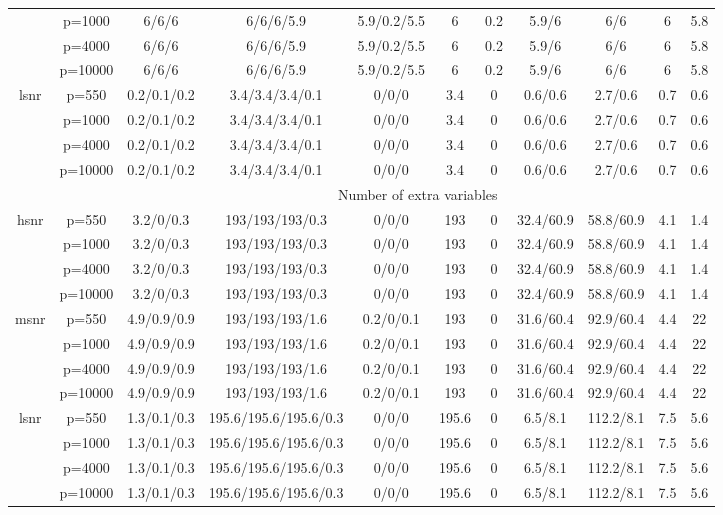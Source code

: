 \begin{table}[ht]
{\begin{tabular}{|c|c|ccccccccc|}
   & p=1000 & 6/6/6 & 6/6/6/5.9 & 5.9/0.2/5.5 & 6 & 0.2 & 5.9/6 & 6/6 & 6 & 5.8 \\ 
   & p=4000 & 6/6/6 & 6/6/6/5.9 & 5.9/0.2/5.5 & 6 & 0.2 & 5.9/6 & 6/6 & 6 & 5.8 \\ 
   & p=10000 & 6/6/6 & 6/6/6/5.9 & 5.9/0.2/5.5 & 6 & 0.2 & 5.9/6 & 6/6 & 6 & 5.8 \\ 
  \midrule\multirow{4}[2]{*}{lsnr} & p=550 & 0.2/0.1/0.2 & 3.4/3.4/3.4/0.1 & 0/0/0 & 3.4 & 0 & 0.6/0.6 & 2.7/0.6 & 0.7 & 0.6 \\ 
   & p=1000 & 0.2/0.1/0.2 & 3.4/3.4/3.4/0.1 & 0/0/0 & 3.4 & 0 & 0.6/0.6 & 2.7/0.6 & 0.7 & 0.6 \\ 
   & p=4000 & 0.2/0.1/0.2 & 3.4/3.4/3.4/0.1 & 0/0/0 & 3.4 & 0 & 0.6/0.6 & 2.7/0.6 & 0.7 & 0.6 \\ 
   & p=10000 & 0.2/0.1/0.2 & 3.4/3.4/3.4/0.1 & 0/0/0 & 3.4 & 0 & 0.6/0.6 & 2.7/0.6 & 0.7 & 0.6 \\ 
   \midrule 
 \multicolumn{1}{|c}{} &       & \multicolumn{9}{c|}{Number of extra variables} \\
\midrule\multirow{4}[2]{*}{hsnr} & p=550 & 3.2/0/0.3 & 193/193/193/0.3 & 0/0/0 & 193 & 0 & 32.4/60.9 & 58.8/60.9 & 4.1 & 1.4 \\ 
   & p=1000 & 3.2/0/0.3 & 193/193/193/0.3 & 0/0/0 & 193 & 0 & 32.4/60.9 & 58.8/60.9 & 4.1 & 1.4 \\ 
   & p=4000 & 3.2/0/0.3 & 193/193/193/0.3 & 0/0/0 & 193 & 0 & 32.4/60.9 & 58.8/60.9 & 4.1 & 1.4 \\ 
   & p=10000 & 3.2/0/0.3 & 193/193/193/0.3 & 0/0/0 & 193 & 0 & 32.4/60.9 & 58.8/60.9 & 4.1 & 1.4 \\ 
  \midrule\multirow{4}[2]{*}{msnr} & p=550 & 4.9/0.9/0.9 & 193/193/193/1.6 & 0.2/0/0.1 & 193 & 0 & 31.6/60.4 & 92.9/60.4 & 4.4 & 22 \\ 
   & p=1000 & 4.9/0.9/0.9 & 193/193/193/1.6 & 0.2/0/0.1 & 193 & 0 & 31.6/60.4 & 92.9/60.4 & 4.4 & 22 \\ 
   & p=4000 & 4.9/0.9/0.9 & 193/193/193/1.6 & 0.2/0/0.1 & 193 & 0 & 31.6/60.4 & 92.9/60.4 & 4.4 & 22 \\ 
   & p=10000 & 4.9/0.9/0.9 & 193/193/193/1.6 & 0.2/0/0.1 & 193 & 0 & 31.6/60.4 & 92.9/60.4 & 4.4 & 22 \\ 
  \midrule\multirow{4}[2]{*}{lsnr} & p=550 & 1.3/0.1/0.3 & 195.6/195.6/195.6/0.3 & 0/0/0 & 195.6 & 0 & 6.5/8.1 & 112.2/8.1 & 7.5 & 5.6 \\ 
   & p=1000 & 1.3/0.1/0.3 & 195.6/195.6/195.6/0.3 & 0/0/0 & 195.6 & 0 & 6.5/8.1 & 112.2/8.1 & 7.5 & 5.6 \\ 
   & p=4000 & 1.3/0.1/0.3 & 195.6/195.6/195.6/0.3 & 0/0/0 & 195.6 & 0 & 6.5/8.1 & 112.2/8.1 & 7.5 & 5.6 \\ 
   & p=10000 & 1.3/0.1/0.3 & 195.6/195.6/195.6/0.3 & 0/0/0 & 195.6 & 0 & 6.5/8.1 & 112.2/8.1 & 7.5 & 5.6 \\ 
   \bottomrule 
\end{tabular}
}
\end{table}
